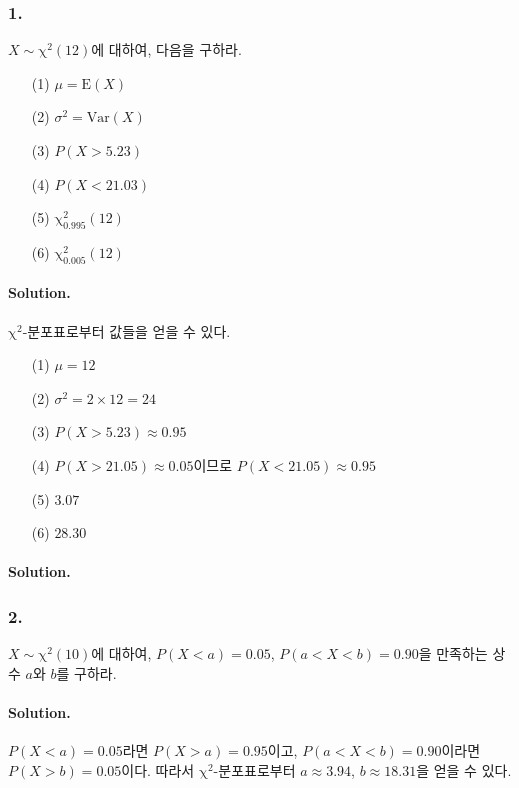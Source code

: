 \subsubsection{1.} $X\sim\mathrm{\chi^2}\left(12\right)$에 대하여, 다음을 구하라.

\begin{itemize}
	\item [(1)] $\mu=\mathrm{E}\left(X\right)$
	\item [(2)] $\sigma^2=\mathrm{Var}\left(X\right)$
	\item [(3)] $P\left(X>5.23\right)$
	\item [(4)] $P\left(X<21.03\right)$
	\item [(5)] $\mathrm{\chi^2_{0.995}}\left(12\right)$
	\item [(6)] $\mathrm{\chi^2_{0.005}}\left(12\right)$
\end{itemize}

\paragraph{Solution.} $\mathrm{\chi^2}$-분포표로부터 값들을 얻을 수 있다.

\begin{itemize}
	\item [(1)] $\mu=12$
	\item [(2)] $\sigma^2 = 2\times12 = 24$
	\item [(3)] $P\left(X>5.23\right)\approx0.95$
	\item [(4)] $P\left(X>21.05\right)\approx0.05$이므로 $P\left(X<21.05\right)\approx0.95$
	\item [(5)] $3.07$
	\item [(6)] $28.30$
\end{itemize}

\paragraph{Solution.}

\subsubsection{2.} $X\sim\mathrm{\chi^2}\left(10\right)$에 대하여, $P\left(X<a\right)=0.05$, $P\left(a<X<b\right)=0.90$을 만족하는
상수 $a$와 $b$를 구하라.

\paragraph{Solution.} $P\left(X<a\right)=0.05$라면 $P\left(X>a\right)=0.95$이고, $P\left(a<X<b\right)=0.90$이라면 $P\left(X>b\right)=0.05$이다.
따라서 $\mathrm{\chi^2}$-분포표로부터 $a \approx 3.94$, $b \approx 18.31$을 얻을 수 있다.

